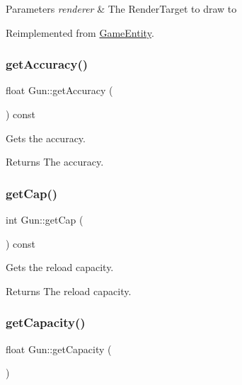 \begin{DoxyParams}{Parameters}
{\em renderer} & The Render\+Target to draw to \\
\hline
\end{DoxyParams}


Reimplemented from \mbox{\hyperlink{class_game_entity_ae8417c4fa668594827706c44091f7366}{Game\+Entity}}.

\mbox{\label{class_gun_ab4fccf96a54546120ab47d8fcc05b730}} 
\subsubsection{\texorpdfstring{getAccuracy()}{getAccuracy()}}
{\footnotesize\ttfamily float Gun\+::get\+Accuracy (\begin{DoxyParamCaption}{ }\end{DoxyParamCaption}) const\hspace{0.3cm}{\ttfamily [inline]}}



Gets the accuracy. 

\begin{DoxyReturn}{Returns}
The accuracy. 
\end{DoxyReturn}
\mbox{\label{class_gun_ab9f8328c07d8155fd378d30a41e60947}} 
\subsubsection{\texorpdfstring{getCap()}{getCap()}}
{\footnotesize\ttfamily int Gun\+::get\+Cap (\begin{DoxyParamCaption}{ }\end{DoxyParamCaption}) const\hspace{0.3cm}{\ttfamily [inline]}}



Gets the reload capacity. 

\begin{DoxyReturn}{Returns}
The reload capacity. 
\end{DoxyReturn}
\mbox{\label{class_gun_a206957fdc26c83489cca7a7ce69ca239}} 
\subsubsection{\texorpdfstring{getCapacity()}{getCapacity()}}
{\footnotesize\ttfamily float Gun\+::get\+Capacity (\begin{DoxyParamCaption}{ }\end{DoxyParamCaption})\hspace{0.3cm}{\ttfamily [inline]}}



